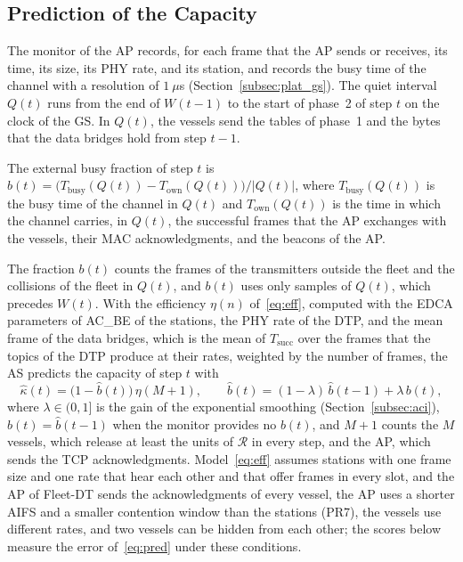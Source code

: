\subsection{Prediction of the Capacity}\label{subsec:pred}

The monitor of the AP records, for each frame that the AP sends or receives, its time, its size, its PHY rate, and its station, and records the busy time of the channel with a resolution of $1~\mu$s (Section~\ref{subsec:plat_gs}). The quiet interval $Q(t)$ runs from the end of $W(t-1)$ to the start of phase~2 of step $t$ on the clock of the GS. In $Q(t)$, the vessels send the tables of phase~1 and the bytes that the data bridges hold from step $t-1$.

\begin{definition}\label{def:busy}
The external busy fraction of step $t$ is $b(t) = \big(T_{\mathrm{busy}}(Q(t)) - T_{\mathrm{own}}(Q(t))\big)/|Q(t)|$, where $T_{\mathrm{busy}}(Q(t))$ is the busy time of the channel in $Q(t)$ and $T_{\mathrm{own}}(Q(t))$ is the time in which the channel carries, in $Q(t)$, the successful frames that the AP exchanges with the vessels, their MAC acknowledgments, and the beacons of the AP.
\end{definition}

The fraction $b(t)$ counts the frames of the transmitters outside the fleet and the collisions of the fleet in $Q(t)$, and $b(t)$ uses only samples of $Q(t)$, which precedes $W(t)$. With the efficiency $\eta(n)$ of~\eqref{eq:eff}, computed with the EDCA parameters of AC\_BE of the stations, the PHY rate of the DTP, and the mean frame of the data bridges, which is the mean of $T_{\mathrm{succ}}$ over the frames that the topics of the DTP produce at their rates, weighted by the number of frames, the AS predicts the capacity of step $t$ with
\begin{equation}
\hat{\kappa}(t) = \big(1 - \hat{b}(t)\big)\,\eta(M + 1), \qquad \hat{b}(t) = (1 - \lambda)\,\hat{b}(t-1) + \lambda\, b(t),
\label{eq:pred}
\end{equation}
where $\lambda \in (0, 1]$ is the gain of the exponential smoothing (Section~\ref{subsec:aci}), $\hat{b}(t) = \hat{b}(t-1)$ when the monitor provides no $b(t)$, and $M + 1$ counts the $M$ vessels, which release at least the units of $\mathcal{R}$ in every step, and the AP, which sends the TCP acknowledgments. Model~\eqref{eq:eff} assumes stations with one frame size and one rate that hear each other and that offer frames in every slot, and the AP of Fleet-DT sends the acknowledgments of every vessel, the AP uses a shorter AIFS and a smaller contention window than the stations (PR7), the vessels use different rates, and two vessels can be hidden from each other; the scores below measure the error of~\eqref{eq:pred} under these conditions.

